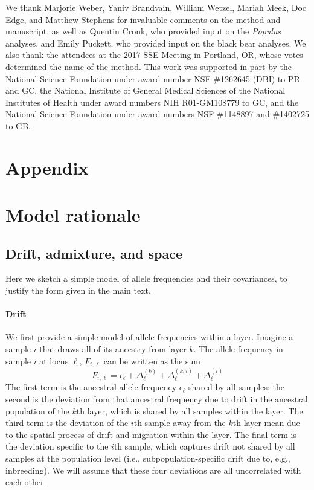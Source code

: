 \documentclass[12pt]{article}
\begin{document}
We thank Marjorie Weber, Yaniv Brandvain, William Wetzel, 
Mariah Meek, Doc Edge, and Matthew Stephens 
for invaluable comments on the method and manuscript, 
as well as Quentin Cronk, who provided input on the \textit{Populus} analyses, 
and Emily Puckett, who provided input on the black bear analyses.
We also thank the attendees at the 2017 SSE Meeting in Portland, OR, 
whose votes determined the name of the method.
This work was supported in part by 
the National Science Foundation under award number NSF \#1262645 (DBI) to PR and GC, 
the National Institute of General Medical Sciences of the National
Institutes of Health under award numbers NIH R01-GM108779 to GC,
and the National Science Foundation under award numbers NSF \#1148897 and \#1402725 to GB.

\newpage
\section*{Appendix}
\renewcommand{\theequation}{A\arabic{equation}}
\setcounter{equation}{0}
\renewcommand{\thetable}{A\arabic{table}}
\setcounter{table}{0}
\renewcommand{\thefigure}{A\arabic{figure}}
\setcounter{figure}{0}
\renewcommand{\thesection}{A\arabic{section}}
\setcounter{section}{0}


\section{Model rationale}
\subsection{Drift, admixture, and space} \label{rationale}
Here we sketch a simple model of allele frequencies and their
covariances, to justify the form given in the main text.
\paragraph{Drift} 
We first provide a simple model of allele frequencies within a layer. 
Imagine a sample $i$ that draws all of its ancestry from layer $k$.
The allele frequency in sample $i$ at locus $\ell$, $F_{i,\ell}$ can be
written as the sum
\begin{equation}
F_{i,\ell} = \epsilon_{\ell} + \Delta^{(k)}_{\ell} +
\Delta^{(k,i)}_{\ell} + \Delta^{(i)}_{\ell}
\label{drift_terms_no_admix}
\end{equation}
The first term is the ancestral allele frequency $\epsilon_\ell$ shared by all samples; 
the second is the deviation from that ancestral frequency 
due to drift in the ancestral population of the $k$th layer,
which is shared by all samples within the layer. 
The third term is the deviation of the $i$th sample away from the $k$th layer mean 
due to the spatial process of drift and migration within the layer.
The final term is the deviation specific to the $i$th sample,
which captures drift not shared by all samples at the population level
(i.e., subpopulation-specific drift due to, e.g., inbreeding). 
We will assume that these four deviations are all uncorrelated with each other.
\end{document}
